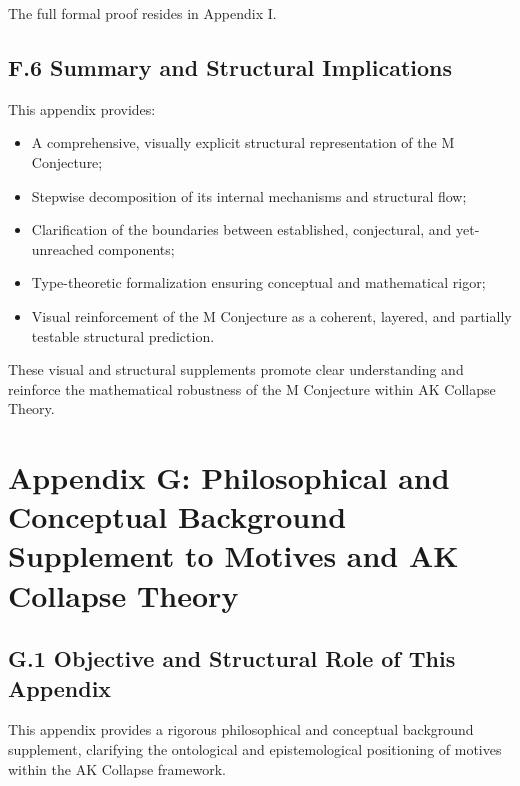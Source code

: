 \documentclass[11pt]{article}
\begin{document}
The full formal proof resides in Appendix I.

\subsection*{F.6 Summary and Structural Implications}

This appendix provides:

\begin{itemize}
    \item A comprehensive, visually explicit structural representation of the M Conjecture;
    \item Stepwise decomposition of its internal mechanisms and structural flow;
    \item Clarification of the boundaries between established, conjectural, and yet-unreached components;
    \item Type-theoretic formalization ensuring conceptual and mathematical rigor;
    \item Visual reinforcement of the M Conjecture as a coherent, layered, and partially testable structural prediction.
\end{itemize}

These visual and structural supplements promote clear understanding and reinforce the mathematical robustness of the M Conjecture within AK Collapse Theory.

\FloatBarrier




\section*{Appendix G: Philosophical and Conceptual Background Supplement to Motives and AK Collapse Theory}

\subsection*{G.1 Objective and Structural Role of This Appendix}

This appendix provides a rigorous philosophical and conceptual background supplement, clarifying the ontological and epistemological positioning of motives within the AK Collapse framework.
\end{document}
